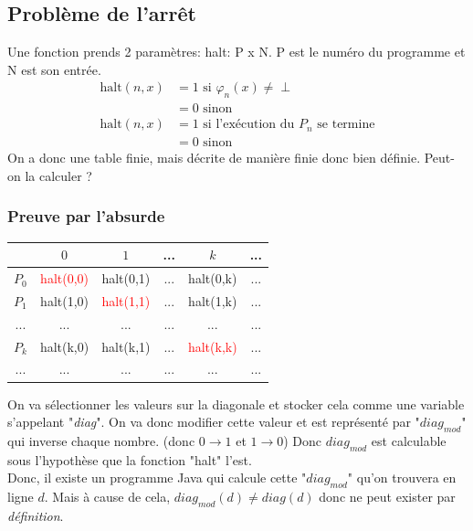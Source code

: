 \documentclass{report}
\begin{document}
\subsection{Problème de l'arrêt}
Une fonction prends 2 paramètres: halt: P x N. P est le numéro du programme et N est son entrée.\\
\begin{align*}
\text{halt}(n,x) &= 1 \text{ si } \varphi_n(x) \neq \perp\\
&= 0 \text{ sinon}\\
\text{halt}(n,x) &= 1 \text{ si l'exécution du } P_n \text{ se termine}\\
&= 0 \text{ sinon}
\end{align*}
On a donc une table finie, mais décrite de manière finie donc bien définie. Peut-on la calculer ?

\subsubsection{Preuve par l'absurde} 

\begin{center}
\begin{tabular}{|c|c|c|c|c|c|}
\hline
& $0$ & $1$ & ... & $k$& ...\\
\hline
$P_0$ & \textcolor{red}{halt(0,0)} & halt(0,1) & ... & halt(0,k) & ...\\
\hline
$P_1$ & halt(1,0) & \textcolor{red}{halt(1,1)} & ... & halt(1,k) & ...\\
\hline
... & ... & ... & ... & ... & ... \\
\hline
$P_k$ & halt(k,0) & halt(k,1) & ... & \textcolor{red}{halt(k,k)} & ...\\
\hline
... & ... & ... & ... & ... & ... \\
\hline
\end{tabular}
\end{center}

On va sélectionner les valeurs sur la diagonale et stocker cela comme une variable s'appelant "\textit{diag}". On va donc modifier cette valeur et est représenté par "\textit{$diag_{mod}$}" qui inverse chaque nombre. (donc $0 \rightarrow 1$ et $1 \rightarrow 0$) Donc \textit{$diag_{mod}$} est calculable sous l'hypothèse que la fonction "halt" l'est.\\

Donc, il existe un programme Java qui calcule cette "$diag_{mod}$" qu'on trouvera en ligne $d$. Mais à cause de cela, $diag_{mod}(d) \neq diag(d)$ donc ne peut exister par \textit{définition}.\\
\end{document}
